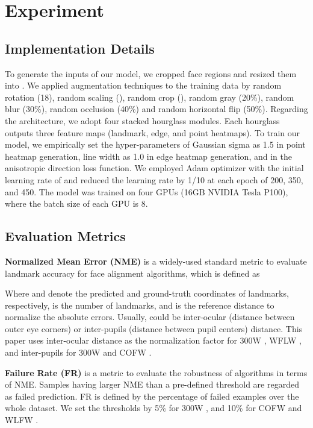 \documentclass[10pt,twocolumn,letterpaper]{article}
\begin{document}
\section{Experiment}
\label{section:experiment}

\subsection{Implementation Details}
\label{subsection:implementation_details}

To generate the inputs of our model, we cropped face regions and resized them into .
We applied augmentation techniques to the training data by random rotation (18\degree), random scaling (), random crop (), random gray (20\%), random blur (30\%), random occlusion (40\%) and random horizontal flip (50\%).
Regarding the architecture, we adopt four stacked hourglass modules. 
Each hourglass outputs three  feature maps (landmark, edge, and point heatmaps).
To train our model, we empirically set the hyper-parameters of Gaussian sigma as 1.5 in point heatmap generation, line width as 1.0 in edge heatmap generation, and  in the anisotropic direction loss function. 
We employed Adam optimizer with the initial learning rate of  and reduced the learning rate by 1/10 at each epoch of 200, 350, and 450.
The model was trained on four GPUs (16GB NVIDIA Tesla P100), where the batch size of each GPU is 8.

\subsection{Evaluation Metrics}
\label{subsection:evaluation_metrics}

\noindent\textbf{Normalized Mean Error (NME)} is a widely-used standard metric to evaluate landmark accuracy for face alignment algorithms, which is defined as



Where  and  denote the predicted and ground-truth coordinates of landmarks, respectively,  is the number of landmarks, and  is the reference distance to normalize the absolute errors.
Usually,  could be inter-ocular (distance between outer eye corners) or inter-pupils (distance between pupil centers) distance. This paper uses inter-ocular distance as the normalization factor for 300W \cite{sagonas2013300}, WFLW \cite{wu2018look}, and inter-pupils for 300W \cite{sagonas2013300} and COFW \cite{burgos2013robust}.

\vspace{5pt}
\noindent\textbf{Failure Rate (FR)} is a metric to evaluate the robustness of algorithms in terms of NME. 
Samples having larger NME than a pre-defined threshold are regarded as failed prediction.
FR is defined by the percentage of failed examples over the whole dataset.
We set the thresholds by 5\% for 300W \cite{sagonas2013300}, and 10\% for COFW \cite{burgos2013robust} and WLFW \cite{wu2018look}.
\end{document}
